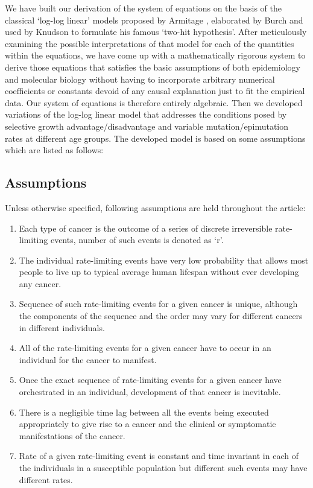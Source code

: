 \documentclass[lineno,sn-basic, Numbered]{sn-jnl}%
\theoremstyle{thmstyleone}%
\theoremstyle{thmstyletwo}%
\theoremstyle{thmstylethree}%
\begin{document}
We have built our derivation of the system of equations on the basis of the classical `log-log linear' models proposed by Armitage \cite{armitage1954age}, elaborated by Burch and used by Knudson \cite{knudson1971mutation} \cite{knudson1981mutation} to formulate his famous `two-hit hypothesis'. \cite{moolgavkar1979twoevent} \cite{luebeck1990twoevent} \cite{barnabas2006epidemiology} After meticulously examining the possible interpretations of that model for each of the quantities within the equations, we have come up with a mathematically rigorous system to derive those equations that satisfies the basic assumptions of both epidemiology \cite{altrock2015mathematics} and molecular biology without having to incorporate arbitrary numerical coefficients or constants devoid of any causal explanation just to fit the empirical data. Our system of equations is therefore entirely algebraic. Then we developed variations of the log-log linear model that addresses the conditions posed by selective growth advantage/disadvantage and variable mutation/epimutation rates at different age groups. The developed model is based on some assumptions which are listed as follows:

\subsection*{Assumptions}
Unless otherwise specified, following assumptions are held throughout the article:
\begin{enumerate}
\item Each type of cancer is the outcome of a series of discrete irreversible rate-limiting events, number of such events is denoted as `r'.
\item The individual rate-limiting events have very low probability that allows most people to live up to typical average human lifespan without ever developing any cancer.
\item Sequence of such rate-limiting events for a given cancer is unique, although the components of the sequence and the order may vary for different cancers in different individuals.
\item All of the rate-limiting events for a given cancer have to occur in an individual for the cancer to manifest.
\item Once the exact sequence of rate-limiting events for a given cancer have orchestrated in an individual, development of that cancer is inevitable.
\item There is a negligible time lag between all the events being executed appropriately to give rise to a cancer and the clinical or symptomatic manifestations of the cancer.
\item Rate of a given rate-limiting event is constant and time invariant in each of the individuals in a susceptible population but different such events may have different rates.
\end{enumerate}
\end{document}

